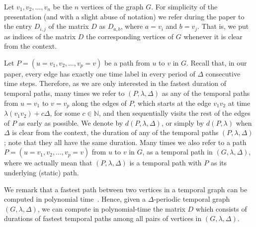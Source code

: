 \documentclass[a4paper,UKenglish,cleveref, autoref, thm-restate, anonymous]{lipics-v2021}
\begin{document}
Let $v_1,v_2,\ldots,v_n$ be the $n$ vertices of the graph $G$. 
For simplicity of the presentation (and with a slight abuse of notation) we refer during the paper to the entry $D_{i,j}$ of the matrix $D$ as $D_{a,b}$, where $a=v_i$ and $b=v_j$. 
That is, we put as indices of the matrix $D$ the corresponding vertices of $G$ whenever it is clear from the context. 


Let $P=(u=v_1, v_2, \dots, v_p=v)$ be a path from $u$ to $v$ in $G$. 
Recall that, in our paper, every edge has exactly one time label in every period of $\Delta$ consecutive time steps. 
Therefore, as we are only interested in the fastest duration of temporal paths, 
many times we refer to $(P,\lambda,\Delta)$ as any of the temporal paths from $u=v_1$ to $v=v_p$ along the edges of $P$, which starts at the edge $v_1 v_2$ at time $\lambda(v_1 v_2) + c \Delta$, for some $c\in \mathbb{N}$, and then sequentially visits the rest of the edges of $P$ as early as possible. 
We denote by $d(P,\lambda,\Delta)$, or simply by $d(P,\lambda)$ when $\Delta$ is clear from the context, the duration of any of the temporal paths $(P,\lambda,\Delta)$; note that they all have the same duration. 
Many times we also refer to a path $P=(u=v_1, v_2, \dots, v_p=v)$ from $u$ to $v$ in $G$,
as a temporal path in $(G,\lambda,\Delta)$,
where we actually mean that $(P,\lambda,\Delta)$ is a temporal path with $P$ as its underlying (static) path.


We remark that a fastest path between two vertices in a temporal graph can be computed in polynomial time~\cite{xuan_computing_2003,Wu2016Efficient}.
Hence, given a $\Delta$-periodic temporal graph $(G,\lambda,\Delta)$, we can compute in polynomial-time  the matrix $D$
which consists of durations of fastest temporal paths among all pairs of vertices in $(G,\lambda,\Delta)$.
\end{document}
